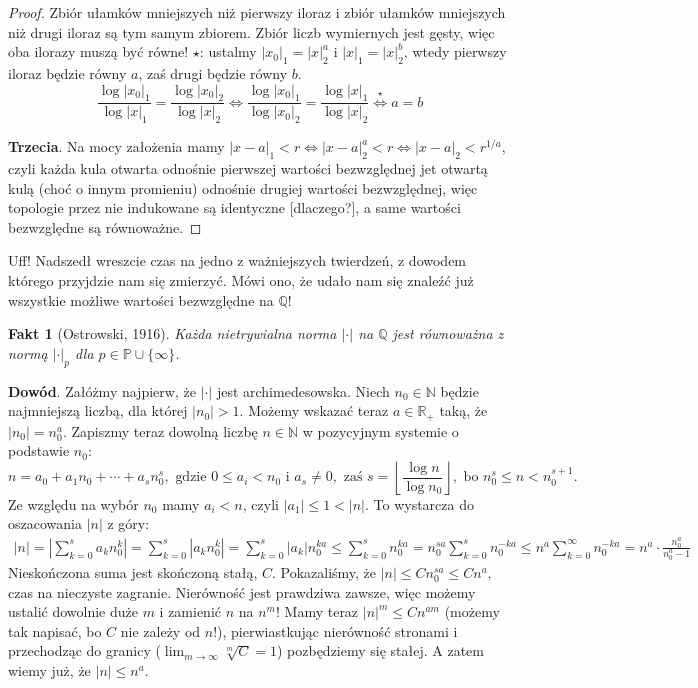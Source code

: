 \documentclass[a4paper,fleqn,9pt]{extarticle}
\newtheorem{fkt}{Fakt}
\begin{document}
\begin{proof}
Zbiór ułamków mniejszych niż pierwszy iloraz i zbiór ułamków mniejszych niż drugi iloraz są tym samym zbiorem. Zbiór liczb wymiernych jest gęsty, więc oba ilorazy muszą być równe! $\star$: ustalmy $|x_0|_1 = |x|_2^a$ i $|x|_1 = |x|_2^b$, wtedy pierwszy iloraz będzie równy $a$, zaś drugi będzie równy $b$.
\begin{equation*}\frac{\log |x_0|_1}{\log |x|_1} = \frac{\log |x_0|_2}{\log |x|_2} \iff \frac{\log |x_0|_1}{\log |x_0|_2} = \frac{\log |x|_1}{\log |x|_2} \overset{\star}{\iff} a = b\end{equation*}

\textbf{Trzecia}. Na mocy założenia mamy $|x-a|_1 < r \Leftrightarrow |x-a|_2^a < r \Leftrightarrow |x-a|_2 < r^{1/a}$,
czyli każda kula otwarta odnośnie pierwszej wartości bezwzględnej jet otwartą kulą (choć o innym promieniu) odnośnie drugiej wartości bezwzględnej, więc topologie przez nie indukowane są identyczne [dlaczego?], a same wartości bezwzględne są równoważne.\end{proof}

Uff! Nadszedł wreszcie czas na jedno z ważniejszych twierdzeń, z dowodem którego przyjdzie nam się zmierzyć. Mówi ono, że udało nam się znaleźć już wszystkie możliwe wartości bezwzględne na $\mathbb Q$!

\begin{fkt}[Ostrowski, 1916] Każda nietrywialna norma $|\cdot|$ na $\mathbb Q$ jest równoważna z normą $|\cdot|_p$ dla $p \in \mathbb P \cup \{\infty\}$.\end{fkt}

\textbf{Dowód}. Załóżmy najpierw, że $|\cdot|$ jest archimedesowska. Niech $n_0 \in\mathbb N$ będzie najmniejszą liczbą, dla której $|n_0| > 1$. Możemy wskazać teraz $a\in\mathbb R_+$ taką, że $|n_0| = n_0^a$. Zapiszmy teraz dowolną liczbę $n\in\mathbb N$ w pozycyjnym systemie o podstawie $n_0$: \begin{equation*}n = a_0 + a_1 n_0 + \cdots + a_s n_0^s, \text{ gdzie }0 \le a_i < n_0 \text{ i } a_s \neq 0, \text{ zaś } s = \left\lfloor\frac{\log n}{\log n_0}\right\rfloor, \text{ bo }n_0^s \le n < n_0^{s+1}.\end{equation*}
Ze względu na wybór $n_0$ mamy $a_i < n$, czyli $|a_1| \le 1 < |n| $. To wystarcza do oszacowania $|n|$ z góry:
\begin{align*}
|n| = 
\left|\sum_{k=0}^s a_k n_0^{k}\right| = 
\sum_{k=0}^s \left|a_k n_0^{k}\right| = 
\sum_{k=0}^s \left|a_k\right| n_0^{ka} \le
\sum_{k=0}^s n_0^{ka} = 
n_0^{sa} \sum_{k=0}^s n_0^{-ka} \le
n^a \sum_{k=0}^\infty n_0^{-ka} = n^a \cdot \frac{n_0^a}{n_0^a - 1}\end{align*}
Nieskończona suma jest skończoną stałą, $C$. Pokazaliśmy, że $|n| \le Cn_0^{sa} \le Cn^a$, czas na nieczyste zagranie. Nierówność jest prawdziwa zawsze, więc możemy ustalić dowolnie duże $m$ i zamienić $n$ na $n^m$! Mamy teraz $|n|^m \le Cn^{am}$ (możemy tak napisać, bo $C$ nie zależy od $n$!), pierwiastkując nierówność stronami i przechodząc do granicy ($\lim_{m\to\infty} \sqrt[m]{C} = 1$) pozbędziemy się stałej. A zatem wiemy już, że $| n| \le n^a$.
\end{document}
